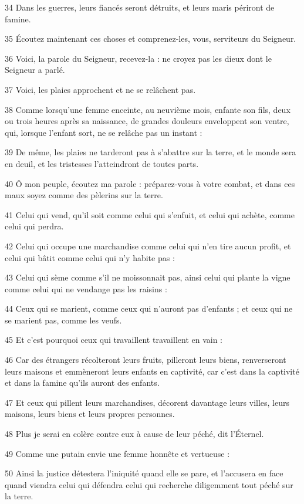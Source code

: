 \par 34 Dans les guerres, leurs fiancés seront détruits, et leurs maris périront de famine.
\par 35 Écoutez maintenant ces choses et comprenez-les, vous, serviteurs du Seigneur.
\par 36 Voici, la parole du Seigneur, recevez-la : ne croyez pas les dieux dont le Seigneur a parlé.
\par 37 Voici, les plaies approchent et ne se relâchent pas.
\par 38 Comme lorsqu'une femme enceinte, au neuvième mois, enfante son fils, deux ou trois heures après sa naissance, de grandes douleurs enveloppent son ventre, qui, lorsque l'enfant sort, ne se relâche pas un instant :
\par 39 De même, les plaies ne tarderont pas à s'abattre sur la terre, et le monde sera en deuil, et les tristesses l'atteindront de toutes parts.
\par 40 Ô mon peuple, écoutez ma parole : préparez-vous à votre combat, et dans ces maux soyez comme des pèlerins sur la terre.
\par 41 Celui qui vend, qu'il soit comme celui qui s'enfuit, et celui qui achète, comme celui qui perdra.
\par 42 Celui qui occupe une marchandise comme celui qui n'en tire aucun profit, et celui qui bâtit comme celui qui n'y habite pas :
\par 43 Celui qui sème comme s'il ne moissonnait pas, ainsi celui qui plante la vigne comme celui qui ne vendange pas les raisins :
\par 44 Ceux qui se marient, comme ceux qui n'auront pas d'enfants ; et ceux qui ne se marient pas, comme les veufs.
\par 45 Et c'est pourquoi ceux qui travaillent travaillent en vain :
\par 46 Car des étrangers récolteront leurs fruits, pilleront leurs biens, renverseront leurs maisons et emmèneront leurs enfants en captivité, car c'est dans la captivité et dans la famine qu'ils auront des enfants.
\par 47 Et ceux qui pillent leurs marchandises, décorent davantage leurs villes, leurs maisons, leurs biens et leurs propres personnes.
\par 48 Plus je serai en colère contre eux à cause de leur péché, dit l'Éternel.
\par 49 Comme une putain envie une femme honnête et vertueuse :
\par 50 Ainsi la justice détestera l'iniquité quand elle se pare, et l'accusera en face quand viendra celui qui défendra celui qui recherche diligemment tout péché sur la terre.

